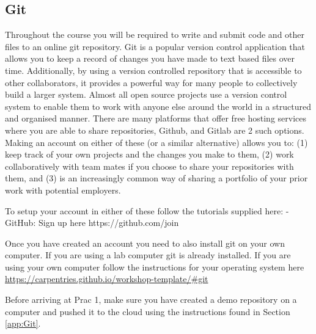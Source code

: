 \subsection{Git}
Throughout the course you will be required to write and submit code and other files to an online git repository.  Git is a popular version control application that allows you to keep a record of changes you have made to text based files over time.  Additionally, by using a version controlled repository that is accessible to other collaborators, it provides a powerful way for many people to collectively build a larger system.  Almost all open source projects use a version control system to enable them to work with anyone else around the world in a structured and organised manner.  There are many platforms that offer free hosting services where you are able to share repositories, Github, and Gitlab are 2 such options.  Making an account on either of these (or a similar alternative) allows you to: (1) keep track of your own projects and the changes you make to them, (2) work collaboratively with team mates if you choose to share your repositories with them, and (3) is an increasingly common way of sharing a portfolio of your prior work with potential employers.

To setup your account in either of these follow the tutorials supplied here:
- GitHub: Sign up here https://github.com/join

Once you have created an account you need to also install git on your own computer.  If you are using a lab computer git is already installed.  If you are using your own computer follow the instructions for your operating system here \href{https://carpentries.github.io/workshop-template/#git}{https://carpentries.github.io/workshop-template/#git}

Before arriving at Prac 1, make sure you have created a demo repository on a computer and pushed it to the cloud using the instructions found in Section \ref{app:Git}.

